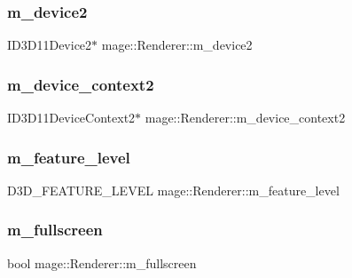 \subsubsection{\texorpdfstring{m\+\_\+device2}{m\_device2}}
{\footnotesize\ttfamily I\+D3\+D11\+Device2$\ast$ mage\+::\+Renderer\+::m\+\_\+device2\hspace{0.3cm}{\ttfamily [protected]}}

\hypertarget{classmage_1_1_renderer_a57bee762f1a8c0ca13c62874a4297f48}{}\label{classmage_1_1_renderer_a57bee762f1a8c0ca13c62874a4297f48} 
\subsubsection{\texorpdfstring{m\+\_\+device\+\_\+context2}{m\_device\_context2}}
{\footnotesize\ttfamily I\+D3\+D11\+Device\+Context2$\ast$ mage\+::\+Renderer\+::m\+\_\+device\+\_\+context2\hspace{0.3cm}{\ttfamily [protected]}}

\hypertarget{classmage_1_1_renderer_aa97b108ef58f7d41ddb527f6ba2bfdf9}{}\label{classmage_1_1_renderer_aa97b108ef58f7d41ddb527f6ba2bfdf9} 
\subsubsection{\texorpdfstring{m\+\_\+feature\+\_\+level}{m\_feature\_level}}
{\footnotesize\ttfamily D3\+D\+\_\+\+F\+E\+A\+T\+U\+R\+E\+\_\+\+L\+E\+V\+EL mage\+::\+Renderer\+::m\+\_\+feature\+\_\+level\hspace{0.3cm}{\ttfamily [protected]}}

\hypertarget{classmage_1_1_renderer_a72bb88b17491bd388460afae9d207b0a}{}\label{classmage_1_1_renderer_a72bb88b17491bd388460afae9d207b0a} 
\subsubsection{\texorpdfstring{m\+\_\+fullscreen}{m\_fullscreen}}
{\footnotesize\ttfamily bool mage\+::\+Renderer\+::m\+\_\+fullscreen\hspace{0.3cm}{\ttfamily [private]}}


